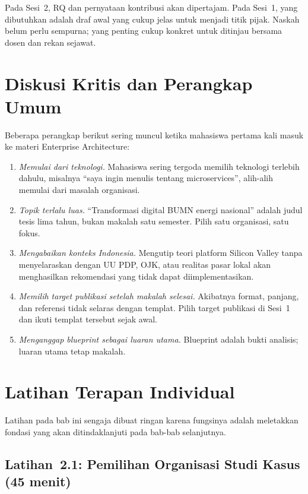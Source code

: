Pada Sesi~2, RQ dan pernyataan kontribusi akan dipertajam. Pada Sesi~1, yang
dibutuhkan adalah draf awal yang cukup jelas untuk menjadi titik pijak.
Naskah belum perlu sempurna; yang penting cukup konkret untuk ditinjau bersama
dosen dan rekan sejawat.

\section{Diskusi Kritis dan Perangkap Umum}

Beberapa perangkap berikut sering muncul ketika mahasiswa pertama kali masuk
ke materi Enterprise Architecture:

\begin{enumerate}
  \item \emph{Memulai dari teknologi.} Mahasiswa sering tergoda memilih
        teknologi terlebih dahulu, misalnya ``saya ingin menulis tentang
        microservices'', alih-alih memulai dari masalah organisasi.
  \item \emph{Topik terlalu luas.} ``Transformasi digital BUMN energi
        nasional'' adalah judul tesis lima tahun, bukan makalah satu semester.
        Pilih satu organisasi, satu fokus.
  \item \emph{Mengabaikan konteks Indonesia.} Mengutip teori platform Silicon
        Valley tanpa menyelaraskan dengan UU PDP, OJK, atau realitas pasar
        lokal akan menghasilkan rekomendasi yang tidak dapat
        diimplementasikan.
  \item \emph{Memilih target publikasi setelah makalah selesai.} Akibatnya
        format, panjang, dan referensi tidak selaras dengan templat. Pilih
        target publikasi di Sesi~1 dan ikuti templat tersebut sejak awal.
  \item \emph{Menganggap blueprint sebagai luaran utama.} Blueprint adalah
        bukti analisis; luaran utama tetap makalah.
\end{enumerate}

\section{Latihan Terapan Individual}

Latihan pada bab ini sengaja dibuat ringan karena fungsinya adalah meletakkan
fondasi yang akan ditindaklanjuti pada bab-bab selanjutnya.

\subsection*{Latihan~2.1: Pemilihan Organisasi Studi Kasus (45 menit)}

